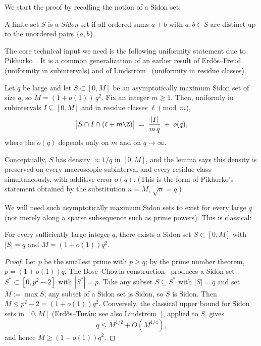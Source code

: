 \documentclass[11pt]{amsart}
\begin{document}
We start the proof by recalling the notion of a Sidon set:
\begin{definition}\label{def:sidon}
A finite set $S$ is a \emph{Sidon} set if all ordered sums $a + b$ with $a,b \in S$ are distinct up to the unordered pairs $\{a,b\}$.
\end{definition}

The core technical input we need is the following uniformity statement due to Pikhurko~\cite[Lemma~10]{Pikhurko2006}. It is a common generalization of an earlier result of Erd\H{o}s--Freud~\cite[Lemma~1]{ErdosFreud1991} (uniformity in subintervals) and of Lindstr\"om~\cite{Lindstrom1998} (uniformity in residue classes).
\begin{lemma}\label{lem:pikhurko}
Let $q$ be large and let $S \subset [0,M]$ be an asymptotically maximum Sidon set of size $q$, so $M = (1+o(1))\,q^2$. Fix an integer $m \geq 1$. Then, uniformly in subintervals $I \subseteq [0,M]$ and in residue classes $\ell \pmod m$,
\[
\bigl| S \cap I \cap (\ell + m\Z) \bigr|
\;=\;
\frac{|I|}{m\,q} \;+\; o(q),
\]
where the $o(q)$ depends only on $m$ and on $q\to\infty$.
\end{lemma}
\begin{remark}
Conceptually, $S$ has density $\approx 1/q$ in $[0,M]$, and the lemma says this density is preserved on every macroscopic subinterval and every residue class simultaneously, with additive error $o(q)$. (This is the form of Pikhurko's~\cite[Lemma~10]{Pikhurko2006} statement obtained by the substitution $n = M$, $\sqrt n = q$.)
\end{remark}

We will need such asymptotically maximum Sidon sets to exist for every large $q$ (not merely along a sparse subsequence such as prime powers). This is classical:
\begin{lemma}\label{lem:existence}
For every sufficiently large integer $q$, there exists a Sidon set $S \subset [0, M]$ with $|S| = q$ and $M = (1+o(1))q^2$.
\end{lemma}
\begin{proof}
Let $p$ be the smallest prime with $p \geq q$; by the prime number theorem, $p = (1+o(1))q$. The Bose--Chowla construction~\cite{BoseChowla1962} produces a Sidon set $S^* \subset [0, p^2-2]$ with $|S^*| = p$. Take any subset $S \subseteq S^*$ with $|S| = q$ and set $M := \max S$; any subset of a Sidon set is Sidon, so $S$ is Sidon. Then $M \leq p^2 - 2 = (1+o(1))q^2$. Conversely, the classical upper bound for Sidon sets in $[0, M]$ (Erd\H{o}s--Tur\'an; see also Lindstr\"om~\cite{Lindstrom1998}), applied to $S$, gives
\[
q \leq M^{1/2} + O(M^{1/4}),
\]
and hence $M \geq (1-o(1))q^2$.
\end{proof}
\end{document}
